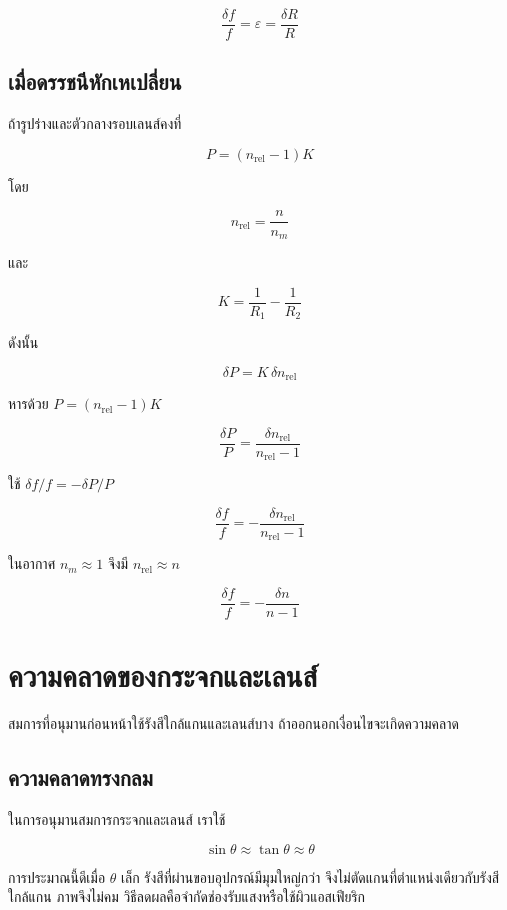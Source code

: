 \begin{tcolorbox}[title={เลนส์เปลี่ยนขนาดแต่คงรูป}]
\[
\boxed{\frac{\delta f}{f}=\varepsilon=\frac{\delta R}{R}}
\]
\end{tcolorbox}

\subsection{เมื่อดรรชนีหักเหเปลี่ยน}

ถ้ารูปร่างและตัวกลางรอบเลนส์คงที่

\[
P=(n_{\text{rel}}-1)K
\]

โดย

\[
n_{\text{rel}}=\frac{n}{n_m}
\]

และ

\[
K=\frac{1}{R_1}-\frac{1}{R_2}
\]

ดังนั้น

\[
\delta P=K\,\delta n_{\text{rel}}
\]

หารด้วย $P=(n_{\text{rel}}-1)K$

\[
\frac{\delta P}{P}
=
\frac{\delta n_{\text{rel}}}{n_{\text{rel}}-1}
\]

ใช้ $\delta f/f=-\delta P/P$

\begin{tcolorbox}[title={ดรรชนีสัมพัทธ์เปลี่ยน}]
\[
\boxed{
\frac{\delta f}{f}
=-
\frac{\delta n_{\text{rel}}}{n_{\text{rel}}-1}}
\]
\end{tcolorbox}

ในอากาศ $n_m\approx1$ จึงมี $n_{\text{rel}}\approx n$

\[
\boxed{
\frac{\delta f}{f}
=-\frac{\delta n}{n-1}}
\]

\section{ความคลาดของกระจกและเลนส์}

สมการที่อนุมานก่อนหน้าใช้รังสีใกล้แกนและเลนส์บาง ถ้าออกนอกเงื่อนไขจะเกิดความคลาด

\subsection{ความคลาดทรงกลม}

ในการอนุมานสมการกระจกและเลนส์ เราใช้

\[
\sin\theta\approx\tan\theta\approx\theta
\]

การประมาณนี้ดีเมื่อ $\theta$ เล็ก รังสีที่ผ่านขอบอุปกรณ์มีมุมใหญ่กว่า จึงไม่ตัดแกนที่ตำแหน่งเดียวกับรังสีใกล้แกน ภาพจึงไม่คม วิธีลดผลคือจำกัดช่องรับแสงหรือใช้ผิวแอสเฟียริก

